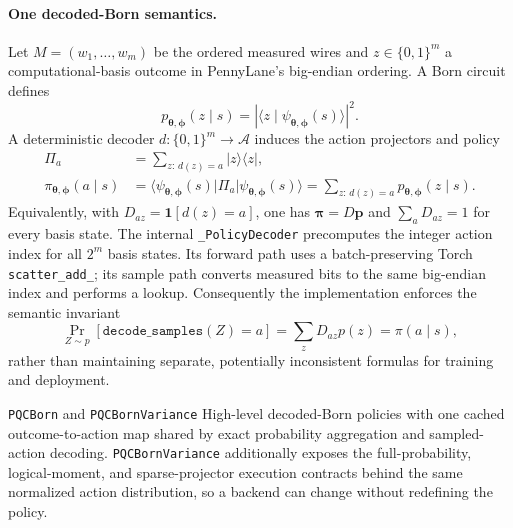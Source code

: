 \documentclass[10pt]{article}
\newcommand{\code}[1]{\texttt{#1}}
\newcommand{\A}{\mathcal{A}}
\begin{document}
\paragraph{One decoded-Born semantics.}

Let $M=(w_1,\ldots,w_m)$ be the ordered measured wires and
$z\in\{0,1\}^m$ a computational-basis outcome in PennyLane's big-endian
ordering.  A Born circuit defines
\begin{equation}
  p_{\bm{\theta},\bm{\phi}}(z\mid s)
  = \left|\langle z\mid
      \psi_{\bm{\theta},\bm{\phi}}(s)\rangle\right|^2.
  \label{eq:basis-born-probability}
\end{equation}
A deterministic decoder $d:\{0,1\}^m\rightarrow\A$ induces the action
projectors and policy
\begin{align}
  \Pi_a
  &=\sum_{z:\,d(z)=a}\lvert z\rangle\!\langle z\rvert,
  \label{eq:action-projector}\\
  \pi_{\bm{\theta},\bm{\phi}}(a\mid s)
  &=\langle\psi_{\bm{\theta},\bm{\phi}}(s)\rvert
    \Pi_a
    \lvert\psi_{\bm{\theta},\bm{\phi}}(s)\rangle
   =\sum_{z:\,d(z)=a}p_{\bm{\theta},\bm{\phi}}(z\mid s).
  \label{eq:born_policy}
\end{align}
Equivalently, with $D_{az}=\mathbf 1[d(z)=a]$, one has
$\bm\pi=D\bm p$ and $\sum_aD_{az}=1$ for every basis state.  The internal
\code{\_PolicyDecoder} precomputes the integer action index for all $2^m$
basis states.  Its forward path uses a batch-preserving Torch
\code{scatter\_add\_}; its sample path converts measured bits to the same
big-endian index and performs a lookup.  Consequently the implementation
enforces the semantic invariant
\begin{equation}
  \Pr_{Z\sim p}\!\left[\code{decode\_samples}(Z)=a\right]
  =\sum_zD_{az}p(z)=\pi(a\mid s),
  \label{eq:decoder-invariant}
\end{equation}
rather than maintaining separate, potentially inconsistent formulas for
training and deployment.

\begin{qaspfeature}{\code{PQCBorn} and \code{PQCBornVariance}}
High-level decoded-Born policies with one cached outcome-to-action map shared
by exact probability aggregation and sampled-action decoding.
\code{PQCBornVariance} additionally exposes the full-probability,
logical-moment, and sparse-projector execution contracts behind the same
normalized action distribution, so a backend can change without redefining
the policy.
\end{qaspfeature}
\end{document}
